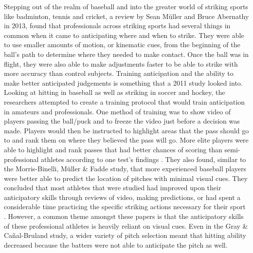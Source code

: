 \documentclass{article}
\begin{document}
\begin{doublespace}
Stepping out of the realm of baseball and into the greater world of striking sports like badminton, tennis and cricket, a review by Sean Müller and Bruce Abernathy in 2013, found that professionals across striking sports had several things in common when it came to anticipating where and when to strike. They were able to use smaller amounts of motion, or kinematic cues, from the beginning of the ball’s path to determine where they needed to make contact. Once the ball was in flight, they were also able to make adjustments faster to be able to strike with more accuracy than control subjects\citep{Muller}. Training anticipation and the ability to make better anticipated judgements is something that a 2011 study looked into. Looking at hitting in baseball as well as striking in soccer and hockey, the researchers attempted to create a training protocol that would train anticipation in amateurs and professionals. One method of training was to show video of players passing the ball/puck and to freeze the video just before a decision was made. Players would then be instructed to highlight areas that the pass should go to and rank them on where they believed the pass will go. More elite players were able to highlight and rank passes that had better chances of scoring than semi-professional athletes according to one test’s findings \citep{Williams}. They also found, similar to the Morris-Binelli, Müller & Fadde study\citep{Morris}, that more experienced baseball players were better able to predict the location of pitches with minimal visual cues. They concluded that most athletes that were studied had improved upon their anticipatory skills through reviews of video, making predictions, or had spent a considerable time practicing the specific striking actions necessary for their sport \citep{Williams}. However, a common theme amongst these papers is that the anticipatory skills of these professional athletes is heavily reliant on visual cues. Even in the Gray & Cañal-Bruland study\citep{Gray}, a wider variety of pitch selection meant that hitting ability decreased because the batters were not able to anticipate the pitch as well. 


\end{doublespace}
\end{document}

